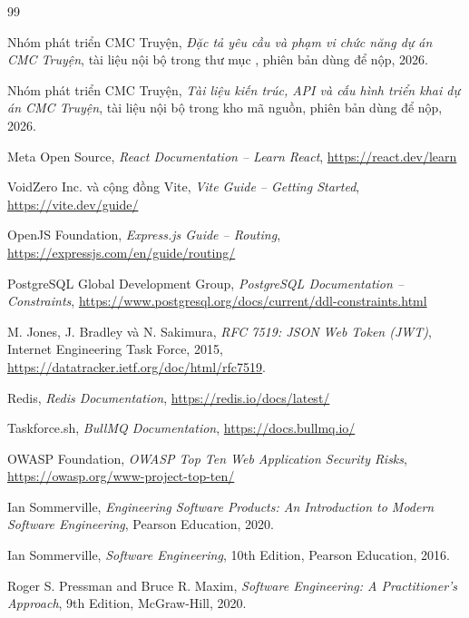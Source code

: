 \begin{thebibliography}{99}

Nhóm phát triển CMC Truyện,
\textit{Đặc tả yêu cầu và phạm vi chức năng dự án CMC Truyện},
tài liệu nội bộ trong thư mục , phiên bản dùng để nộp, 2026.

Nhóm phát triển CMC Truyện,
\textit{Tài liệu kiến trúc, API và cấu hình triển khai dự án CMC Truyện},
tài liệu nội bộ trong kho mã nguồn, phiên bản dùng để nộp, 2026.

Meta Open Source,
\textit{React Documentation -- Learn React},
\url{https://react.dev/learn}

VoidZero Inc. và cộng đồng Vite,
\textit{Vite Guide -- Getting Started},
\url{https://vite.dev/guide/}

OpenJS Foundation,
\textit{Express.js Guide -- Routing},
\url{https://expressjs.com/en/guide/routing/}

PostgreSQL Global Development Group,
\textit{PostgreSQL Documentation -- Constraints},
\url{https://www.postgresql.org/docs/current/ddl-constraints.html}

M. Jones, J. Bradley và N. Sakimura,
\textit{RFC 7519: JSON Web Token (JWT)},
Internet Engineering Task Force, 2015,
\url{https://datatracker.ietf.org/doc/html/rfc7519}.

Redis,
\textit{Redis Documentation},
\url{https://redis.io/docs/latest/}

Taskforce.sh,
\textit{BullMQ Documentation},
\url{https://docs.bullmq.io/}

OWASP Foundation,
\textit{OWASP Top Ten Web Application Security Risks},
\url{https://owasp.org/www-project-top-ten/}

Ian Sommerville,
\textit{Engineering Software Products: An Introduction to Modern Software Engineering},
Pearson Education, 2020.

Ian Sommerville,
\textit{Software Engineering}, 10th Edition,
Pearson Education, 2016.

Roger S. Pressman and Bruce R. Maxim,
\textit{Software Engineering: A Practitioner's Approach}, 9th Edition,
McGraw-Hill, 2020.

\end{thebibliography}
